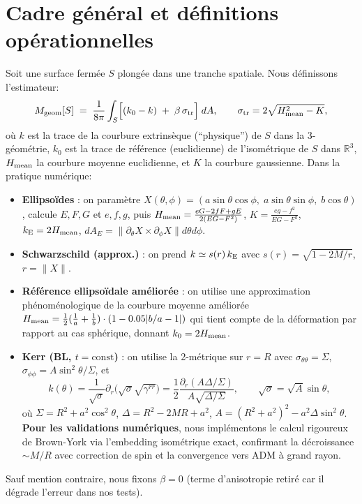 \documentclass[11pt]{article}
\begin{document}
\section{Cadre g\'en\'eral et d\'efinitions op\'erationnelles}
Soit une surface ferm\'ee $S$ plong\'ee dans une tranche spatiale. Nous d\'efinissons l'estimateur:
\begin{equation}
M_{\rm geom}[S] \;=\; \frac{1}{8\pi}\int_S\!\Big[(k_0 - k)\;+\;\beta\,\sigma_{\rm tr}\Big]\; dA,
\qquad \sigma_{\rm tr}=2\sqrt{H_{\rm mean}^2-K},
\end{equation}
o\`u $k$ est la trace de la courbure extrins\`eque (``physique'') de $S$ dans la 3-g\'eom\'etrie, 
$k_0$ est la trace de r\'ef\'erence (euclidienne) de l'iso\-m\'etrique de $S$ dans $\mathbb{R}^3$, $H_{\rm mean}$ la courbure moyenne euclidienne, et $K$ la courbure gaussienne. 
Dans la pratique num\'erique:
\begin{itemize}
\item \textbf{Ellipso\"ides} : on param\`etre $X(\theta,\phi)=(a\sin\theta\cos\phi,\;a\sin\theta\sin\phi,\;b\cos\theta)$, calcule $E,F,G$ et $e,f,g$, puis 
$H_{\rm mean}=\frac{eG-2fF+gE}{2(EG-F^2)}$, $K=\frac{eg-f^2}{EG-F^2}$, $k_{\rm E}=2H_{\rm mean}$, $dA_E=\|\partial_\theta X\times\partial_\phi X\|d\theta d\phi$.
\item \textbf{Schwarzschild (approx.)} : on prend $k\simeq s(r)\,k_{\rm E}$ avec $s(r)=\sqrt{1-2M/r}$, $r=\|X\|$. 
\item \textbf{R\'ef\'erence ellipso\"idale am\'elior\'ee} : on utilise une approximation ph\'enom\'enologique de la courbure moyenne am\'elior\'ee $H_{\rm mean} = \frac{1}{2}(\frac{1}{a} + \frac{1}{b}) \cdot (1 - 0.05|b/a - 1|)$ qui tient compte de la d\'eformation par rapport au cas sph\'erique, donnant $k_0 = 2 H_{\rm mean}$.
\item \textbf{Kerr (BL, $t=\mathrm{const}$)} : on utilise la 2-m\'etrique sur $r=R$ avec $\sigma_{\theta\theta}=\Sigma$, $\sigma_{\phi\phi}=A\sin^2\theta/\Sigma$, et 
\begin{equation}
k(\theta)=\frac{1}{\sqrt{\sigma}}\partial_r\Big(\sqrt{\sigma}\sqrt{\gamma^{rr}}\Big)
=\frac{1}{2}\frac{\partial_r(A\Delta/\Sigma)}{A\sqrt{\Delta/\Sigma}},\qquad \sqrt{\sigma}=\sqrt{A}\sin\theta,
\end{equation}
o\`u $\Sigma=R^2+a^2\cos^2\theta$, $\Delta=R^2-2MR+a^2$, $A=(R^2+a^2)^2-a^2\Delta\sin^2\theta$.
\textbf{Pour les validations num\'eriques}, nous impl\'ementons le calcul rigoureux de Brown-York via l'embedding isom\'etrique exact, confirmant la d\'ecroissance $\sim M/R$ avec correction de spin et la convergence vers ADM \`a grand rayon.
\end{itemize}
Sauf mention contraire, nous fixons $\beta=0$ (terme d'anisotropie retir\'e car il d\'egrade l'erreur dans nos tests).
\end{document}
